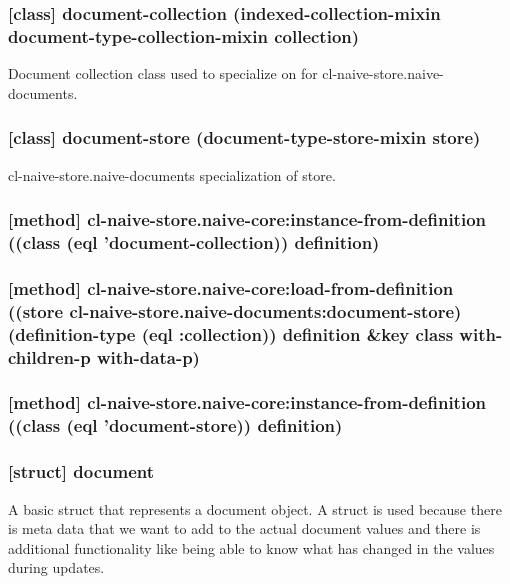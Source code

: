 \documentclass[11pt]{article}
\begin{document}
\subsubsection{[class] document-collection (indexed-collection-mixin document-type-collection-mixin collection)}
\label{sec:orgfd33920}

Document collection class used to specialize on for cl-naive-store.naive-documents.

\subsubsection{[class] document-store (document-type-store-mixin store)}
\label{sec:orgc458f9b}

cl-naive-store.naive-documents specialization of store.

\subsubsection{[method] cl-naive-store.naive-core:instance-from-definition ((class (eql 'document-collection)) definition)}
\label{sec:orgba84589}

\subsubsection{[method] cl-naive-store.naive-core:load-from-definition ((store cl-naive-store.naive-documents:document-store) (definition-type (eql :collection)) definition \&key class with-children-p with-data-p)}
\label{sec:orga39ede8}

\subsubsection{[method] cl-naive-store.naive-core:instance-from-definition ((class (eql 'document-store)) definition)}
\label{sec:org20693a8}

\subsubsection{[struct] document}
\label{sec:org29eb887}
A basic struct that represents a document object. A struct is used
because there is meta data that we want to add to the actual document
values and there is additional functionality like being able to know
what has changed in the values during updates.
\end{document}
